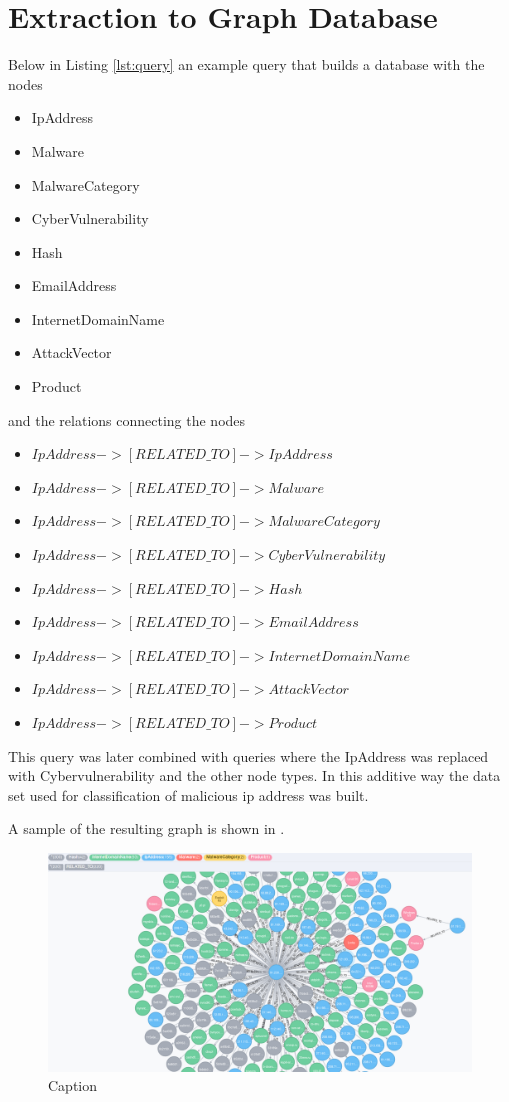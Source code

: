 \chapter{Extraction to Graph Database}\label{ap:query}
Below in Listing \ref{lst:query} an example query that builds a database with the nodes
\begin{itemize}
    \item IpAddress
    \item Malware
    \item MalwareCategory
    \item CyberVulnerability
    \item Hash
    \item EmailAddress
    \item InternetDomainName
    \item AttackVector
    \item Product
\end{itemize}
and the relations connecting the nodes
\begin{itemize}
    \item $IpAddress->[RELATED\_TO]->IpAddress$
    \item $IpAddress->[RELATED\_TO]->Malware$
    \item $IpAddress->[RELATED\_TO]->MalwareCategory$
    \item $IpAddress->[RELATED\_TO]->CyberVulnerability$
    \item $IpAddress->[RELATED\_TO]->Hash$
    \item $IpAddress->[RELATED\_TO]->EmailAddress$
    \item $IpAddress->[RELATED\_TO]->InternetDomainName$
    \item $IpAddress->[RELATED\_TO]->AttackVector$
    \item $IpAddress->[RELATED\_TO]->Product$
\end{itemize}

This query was later combined with queries where the IpAddress was replaced with Cybervulnerability and the other node types. In this additive way the data set used for classification of malicious ip address was built.

A sample of the resulting graph is shown in .

\begin{figure}
    \centering
    \includegraphics[width=\textwidth]{images/neo_ex_q.png}
    \caption{Caption}
    \label{fig:qdb}
\end{figure}

